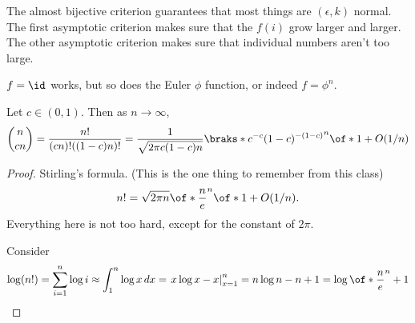 \documentclass{article}
\begin{document}
The almost bijective criterion guarantees that 
most things are $(\epsilon,k)$ normal.
The first asymptotic criterion makes sure that 
the $f(i)$ grow larger and larger. The other 
asymptotic criterion makes sure that individual
numbers aren't too large.

$f=\id$ works, but so does the Euler $\phi$ function,
or indeed $f=\phi^n$.

\begin{lemma}
    Let $c\in(0,1)$. Then as $n\to\infty$,
    \[\binom{n}{cn} = \frac{n!}{(cn)!((1-c)n)!}
    = \frac{1}{\sqrt{2\pi c(1-c)n}}
    \braks*{c^{-c}(1-c)^{-(1-c)}}^n
    \of*{1+O(1/n)}
    \]
\end{lemma}
\begin{proof}
    Stirling's formula. 
    (This is the one thing to remember from this class)
    \[ n!=\sqrt{2\pi n} \of*{\frac{n}{e}}^n 
    \of*{1+O(1/n)}.\]
    Everything here is not too hard, except for 
    the constant of $2\pi$.

    Consider 
    \[ \log(n!) = \sum_{i=1}^n \log i
    \approx 
    \int_1^n \log x\, dx
    = \left. x \log x - x \right|^n_{x=1} 
    = n\log n - n + 1
    = \log\of*{\frac{n}{e}}^n + 1
    \]
\end{proof}
\end{document}
